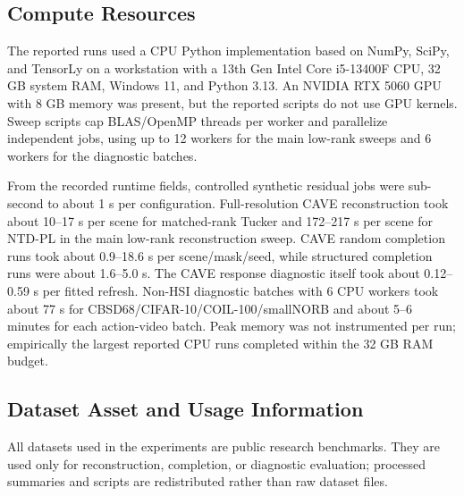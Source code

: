 \subsection{Compute Resources}
\label{app:compute_resources}

The reported runs used a CPU Python implementation based on NumPy, SciPy, and
TensorLy on a workstation with a 13th Gen Intel Core i5-13400F CPU, 32 GB
system RAM, Windows 11, and Python 3.13. An NVIDIA RTX 5060 GPU with 8 GB
memory was present, but the reported scripts do not use GPU kernels. Sweep
scripts cap BLAS/OpenMP threads per worker and parallelize independent jobs,
using up to 12 workers for the main low-rank sweeps and 6 workers for the
diagnostic batches.

From the recorded runtime fields, controlled synthetic residual jobs were
sub-second to about 1 s per configuration. Full-resolution CAVE reconstruction
took about 10--17 s per scene for matched-rank Tucker and 172--217 s per scene
for NTD-PL in the main low-rank reconstruction sweep. CAVE random completion
runs took about 0.9--18.6 s per scene/mask/seed, while structured completion
runs were about 1.6--5.0 s. The CAVE response diagnostic itself
took about 0.12--0.59 s per fitted refresh. Non-HSI diagnostic batches with
6 CPU workers took about 77 s for CBSD68/CIFAR-10/COIL-100/smallNORB and about
5--6 minutes for each action-video batch. Peak memory was not instrumented per
run; empirically the largest reported CPU runs completed within the 32 GB RAM
budget.

\subsection{Dataset Asset and Usage Information}
\label{app:dataset_assets}

All datasets used in the experiments are public research benchmarks. They are
used only for reconstruction, completion, or diagnostic evaluation; processed
summaries and scripts are redistributed rather than raw dataset files.

